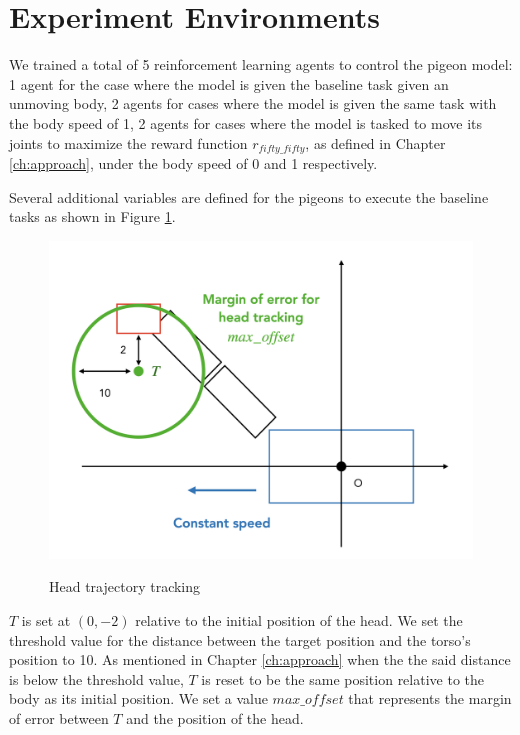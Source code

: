 \section{Experiment Environments}
  We trained a total of 5 reinforcement learning agents to control the pigeon model: 1 agent for the case where the model is given the baseline task given an unmoving body, 2 agents for cases where the model is given the same task with the body speed of 1, 2 agents for cases where the model is tasked to move its joints to maximize the reward function $r_{fifty\_fifty}$, as defined in Chapter \ref{ch:approach}, under the body speed of 0 and 1 respectively.

    Several additional variables are defined for the pigeons to execute the baseline tasks as shown in Figure \ref{fig:pigeon_target}.
      \begin{figure}[H]
          \centering
          \includegraphics[width=1\textwidth]{figures/pigeon_diagram/pigeon_diagram_002.png}
          \label{fig:pigeon_target}
          \caption{Head trajectory tracking}
      \end{figure}
    $T$ is set at $(0, -2)$ relative to the initial position of the head.
    We set the threshold value for the distance between the target position and the torso's position to 10. As mentioned in Chapter \ref{ch:approach} when the the said distance is below the threshold value, $T$ is reset to be the same position relative to the body as its initial position.
    We set a value $max\_offset$ that represents the margin of error between $T$ and the position of the head.

